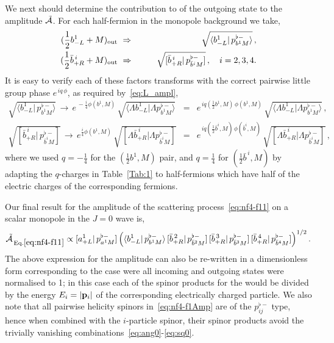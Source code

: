 \documentclass[a4paper,11pt]{article}
\begin{document}
We next should determine the contribution to of the outgoing state to the amplitude $\tilde{\cal A}$.
For each half-fermion in the monopole background we take,
\begin{eqnarray}
\label{eq:out1}
 (\frac{1}{2} b_{-L}^1 +  M)_{\rm out} \,\, \Rightarrow \qquad   && \sqrt{\langle b_{-L}^1 | \,p^{\flat -}_{b^1 M} \rangle} \,,\\
 \label{eq:outi}
 (\frac{1}{2} \bar{b}_{+R}^{\,i} +  M)_{\rm out} \,\, \Rightarrow \qquad   &&\sqrt{[\bar{b}_{+R}^{\,i} | \, p^{\flat -}_{\bar{b}^i M} ]}\,, \quad i=2,3,4.
\end{eqnarray}
It is easy to verify each of these factors transforms with the correct pairwise little group phase $e^{\, i q \, \phi}$, as required by~\eqref{eq:L_ampl},
\begin{eqnarray}
\nonumber
  \sqrt{\langle b_{-L}^1 | \,p^{\flat -}_{b^1 M} \rangle} \,\to\, e^{\,-\frac{i}{4} \phi(b^1,M)}\,
  \sqrt{\langle \Lambda b_{-L}^1 | \Lambda p^{\flat -}_{b^1 M} \rangle} &=&
  e^{\,{i} q(\frac{1}{2}b^1,M) \,\phi(b^1,M)}\,
  \sqrt{\langle \Lambda b_{-L}^1 | \Lambda p^{\flat -}_{b^1 M} \rangle}
  \,,\\
  \nonumber
  \sqrt{[\bar{b}_{+R}^{\,i} | \, p^{\flat -}_{\bar{b}^i M} ]} \,\to\, e^{\frac{i}{4} \phi(b^1,M)}\,
\sqrt{[ \Lambda \bar{b}_{+R}^{\,i} | \Lambda  p^{\flat -}_{\bar{b}^i M} ]} &=&
  e^{\,{i} q(\frac{1}{2}\bar{b}^i,M) \,\phi(\bar{b}^i,M)}\,
  \sqrt{[ \Lambda \bar{b}_{+R}^{\,i} | \Lambda  p^{\flat -}_{\bar{b}^i M} ]}\,,
\end{eqnarray}
where we used $q=-\frac{1}{4}$ for the $(\frac{1}{2} b^1,M)$ pair, and $q=\frac{1}{4}$ for $(\frac{1}{2}\bar{b}^{\,i},M)$ by adapting
 the $q$-charges in Table~\ref{Tab:1} to half-fermions which have half of the electric charges of the corresponding fermions. 

Our final result for the amplitude of the scattering process~\eqref{eq:nf4-f11} on a scalar monopole in the $J=0$ wave is,
\begin{equation}
\label{eq:nf4-f1Amp}
 \tilde{\cal A}_{\, \rm Eq.\eqref{eq:nf4-f11}} \propto
  [a_{+L}^1 | \, p^{\flat -}_{a^1 M} ]\left(\langle b_{-L}^1 | \,p^{\flat -}_{b^1 M} \rangle\,
  [\bar{b}_{+R}^{\,2} | \, p^{\flat -}_{\bar{b}^2 M} ]\,
   [\bar{b}_{+R}^{\,3} | \, p^{\flat -}_{\bar{b}^3 M} ]\,
    [\bar{b}_{+R}^{\,4} | \, p^{\flat -}_{\bar{b}^4 M} ]
  \right)^{1/2}.
\end{equation} 
The above expression for the amplitude can also be re-written in a dimensionless form corresponding to the case were all incoming and outgoing states were 
normalised to 1; 
in this case each of the spinor products for the would be divided by the energy $E_i=|{\bf p}_{i}|$ of the corresponding electrically charged particle.
We also note that all pairwise helicity spinors in~\eqref{eq:nf4-f1Amp} are of the $p^{\flat -}_{ij}$ type, hence when combined with the $i$-particle spinor, 
their spinor products avoid the trivially vanishing combinations~\eqref{eq:ang0}-\eqref{eq:sq0}.
\end{document}
